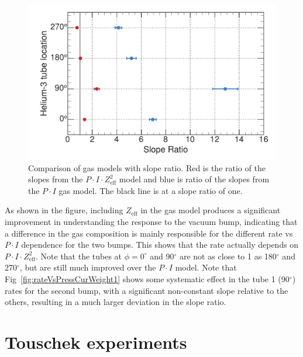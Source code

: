 \begin{figure}
	\centerfloat
		\includegraphics[width=\textwidth]{images/SlopeRatioPlot_He3}
	\caption[Comparison of gas models with slope ratio]{Comparison of gas models with slope ratio. Red is the ratio of the slopes from the $P\cdot I\cdot Z_{\mathrm{eff}}^2$ model and blue is ratio of the slopes from the $P\cdot I$ gas model. The black line is at a slope ratio of one.}	
	\label{fig:slopeRatio}
\end{figure}

As shown in the figure, including $Z_{\mathrm{eff}}$ in the gas model produces a significant improvement in understanding the response to the vacuum bump, indicating that a difference in the gas composition is mainly responsible for the different rate vs $P\cdot I$ dependence for the two bumps. This shows that the rate actually depends on $P\cdot I\cdot Z_{\mathrm{eff}}^2$. Note that the \he tubes at $\phi=0^{\circ}$ and 90$^{\circ}$ are not as close to 1 as 180$^{\circ}$ and 270$^{\circ}$, but are still much improved over the $P\cdot I$ model. Note that Fig~\ref{fig:rateVsPressCurWeight1} shows some systematic effect in the tube 1 (90$^{\circ}$) rates for the second bump, with a significant non-constant slope relative to the others, resulting in a much larger deviation in the slope ratio.





\section{Touschek experiments}
\label{sec:TousExp}

